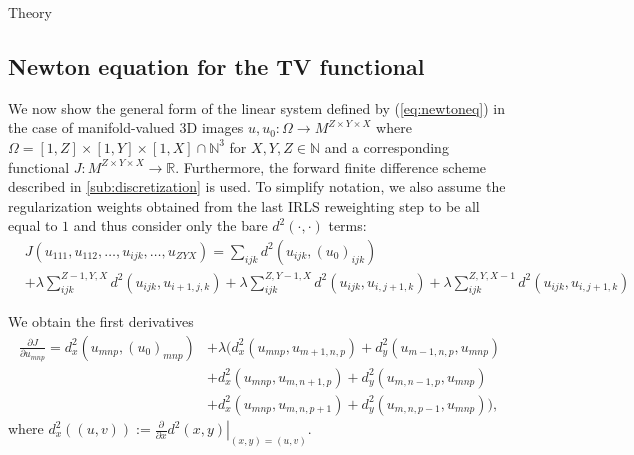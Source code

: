 \begin{chapter}{Theory}
\subsection{Newton equation for the TV functional} %
\label{sub:NewtonequationfortheTVfunctional}
We now show the general form of the linear system defined by (\ref{eq:newtoneq}) in the case of manifold-valued 3D images $u,u_0: \Omega\to M^{Z\times Y\times X}$
where $\Omega=[1,Z]\times[1,Y]\times[1,X]\cap \mathbb{N}^3$ for $X,Y,Z\in\mathbb{N}$ and a corresponding functional $J:  M^{Z\times Y\times X} \to \mathbb{R}$.
Furthermore, the forward finite difference scheme described in \ref{sub:discretization} is used. To simplify notation,
we also assume the regularization weights obtained from the last IRLS reweighting step to be all equal to $1$ and thus consider only the
bare $d^2(\cdot,\cdot)$ terms:
\begin{align}
    & J(u_{111},u_{112},\ldots,u_{ijk},\dots,u_{ZYX}) = \sum_{ijk} d^2(u_{ijk},(u_0)_{ijk}) \\ 
    &+ \lambda \sum_{ijk}^{Z-1,Y,X}d^{2}(u_{ijk},u_{i+1,j,k}) 
    + \lambda \sum_{ijk}^{Z,Y-1,X}d^{2}(u_{ijk},u_{i,j+1,k}) 
    + \lambda \sum_{ijk}^{Z,Y,X-1}d^{2}(u_{ijk},u_{i,j+1,k}) \nonumber 
\end{align}

We obtain the first derivatives
\begin{align}
    \label{eq:funcfirstder}
    \frac{\partial J}{\partial u_{mnp}} = d^2_x(u_{mnp},(u_0)_{mnp}) &+ \lambda 
	\big(
	    d_x^2(u_{mnp},u_{m+1,n,p}) +  d_y^2(u_{m-1,n,p},u_{mnp}) \\
	  &+  d_x^2(u_{mnp},u_{m,n+1,p}) +  d_y^2(u_{m,n-1,p},u_{mnp}) \nonumber \\
	  &+  d_x^2(u_{mnp},u_{m,n,p+1}) +  d_y^2(u_{m,n,p-1},u_{mnp})\big), \nonumber 
\end{align}
where $d^2_x((u,v)):=\frac{\partial}{\partial x}\left. d^2(x,y)\right\vert_{(x,y)=(u,v)}$.\\


\end{chapter}

